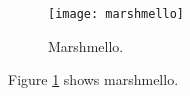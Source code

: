 \documentclass{article}
\begin{document}
    \begin{figure}
	\texttt{[image: marshmello]}
	    \caption{Marshmello.}
        \label{fig:marshmello1}
    \end{figure}
    Figure \ref{fig:marshmello1} shows marshmello.
    
\end{document}
